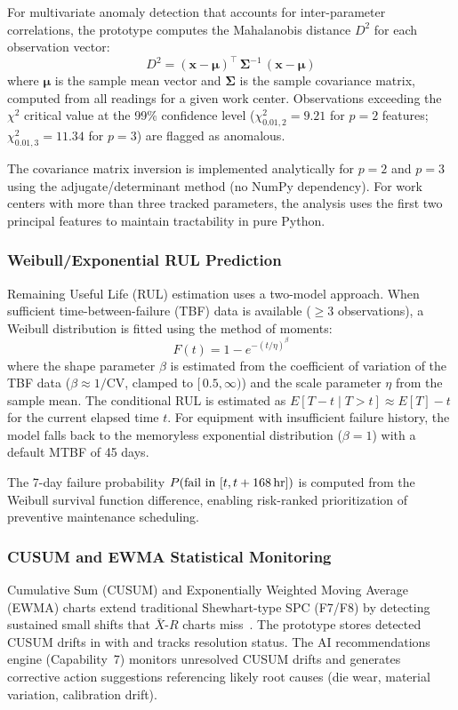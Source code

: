 For multivariate anomaly detection that accounts for inter-parameter
correlations, the prototype computes the Mahalanobis distance $D^2$ for each
observation vector:
\[
D^2 = (\mathbf{x} - \boldsymbol{\mu})^\top \, \boldsymbol{\Sigma}^{-1} \, (\mathbf{x} - \boldsymbol{\mu})
\]
where $\boldsymbol{\mu}$ is the sample mean vector and $\boldsymbol{\Sigma}$ is
the sample covariance matrix, computed from all readings for a given work
center.  Observations exceeding the $\chi^2$ critical value at the 99\%
confidence level ($\chi^2_{0.01,2} = 9.21$ for $p=2$ features;
$\chi^2_{0.01,3} = 11.34$ for $p=3$) are flagged as anomalous.

The covariance matrix inversion is implemented analytically for $p = 2$ and
$p = 3$ using the adjugate/determinant method (no NumPy dependency).  For work
centers with more than three tracked parameters, the analysis uses the first
two principal features to maintain tractability in pure Python.

\subsubsection{Weibull/Exponential RUL Prediction}

Remaining Useful Life (RUL) estimation uses a two-model approach.  When
sufficient time-between-failure (TBF) data is available ($\geq 3$
observations), a Weibull distribution is fitted using the method of moments:
\[
F(t) = 1 - e^{-(t/\eta)^\beta}
\]
where the shape parameter $\beta$ is estimated from the coefficient of variation
of the TBF data ($\beta \approx 1/\text{CV}$, clamped to $[\,0.5, \infty)$)
and the scale parameter $\eta$ from the sample mean.  The conditional RUL is
estimated as $E[T - t \mid T > t] \approx E[T] - t$ for the current elapsed
time $t$.  For equipment with insufficient failure history, the model falls back
to the memoryless exponential distribution ($\beta = 1$) with a default
MTBF of 45 days.

The 7-day failure probability $P(\text{fail in } [t, t+168\text{\,hr}])$ is
computed from the Weibull survival function difference, enabling risk-ranked
prioritization of preventive maintenance scheduling.

\subsubsection{CUSUM and EWMA Statistical Monitoring}

Cumulative Sum (CUSUM) and Exponentially Weighted Moving Average (EWMA) charts
extend traditional Shewhart-type SPC (F7/F8) by detecting sustained small
shifts that $\bar{X}$-$R$ charts miss~\cite{montgomery2019}.  The prototype
stores detected CUSUM drifts in  with
 and tracks resolution status.  The AI
recommendations engine (Capability~7) monitors unresolved CUSUM drifts and
generates corrective action suggestions referencing likely root causes (die
wear, material variation, calibration drift).

